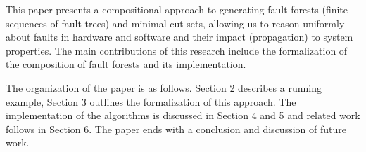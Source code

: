 
This paper presents a compositional approach to generating fault forests (finite sequences of fault trees) and minimal cut sets, allowing us to reason uniformly about faults in hardware and software and their impact (propagation) to system properties. The main contributions of this research include the formalization of the composition of fault forests and its implementation.


The organization of the paper is as follows.  Section 2 describes a running example, Section 3 outlines the formalization of this approach. The implementation of the algorithms is discussed in Section 4 and 5 and related work follows in Section 6. The paper ends with a conclusion and discussion of future work.
